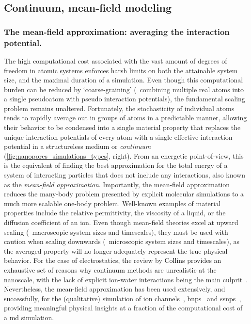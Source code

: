 

\subsection{Continuum, mean-field modeling}
%

\subsubsection{The mean-field approximation: averaging the interaction potential.}
%

The high computational cost associated with the vast amount of degrees of freedom in atomic systems enforces
harsh limits on both the attainable system size, and the maximal duration of a simulation. Even though this
computational burden can be reduced by `coarse-graining' (\ie~combining multiple real atoms into a single
pseudoatom with pseudo interaction potentials), the fundamental scaling problem remains unaltered.
Fortunately, the stochasticity of individual atoms tends to rapidly average out in groups of atoms in a
predictable manner, allowing their behavior to be condensed into a single material property that replaces the
unique interaction potentials of every atom with a single effective interaction potential in a structureless
medium or \emph{continuum} (\cref{fig:nanopores_simulations_types}, right). From an energetic point-of-view,
this is the equivalent of finding the best approximation for the total energy of a system of interacting
particles that does not include any interactions, also known as the \emph{mean-field approximation}.
Importantly, the mean-field approximation reduces the many-body problem presented by explicit molecular
simulations to a much more scalable one-body problem. Well-known examples of material properties include the
relative permittivity, the viscosity of a liquid, or the diffusion coefficient of an ion. Even though
mean-field theories excel at upward scaling (\ie~macroscopic system sizes and timescales), they must be used
with caution when scaling downwards (\ie~microscopic system sizes and timescales), as the averaged property
will no longer adequately represent the true physical behavior. For the case of electrostatics, the review by
Collins provides an exhaustive set of reasons why continuum methods are unrealistic at the nanoscale, with the
lack of explicit ion-water interactions being the main culprit~\cite{Collins-2012}. Nevertheless, the
mean-field approximation has been used extensively, and successfully, for the (qualitative) simulation of ion
channels~\cite{Im-2002,Furini-2006,Liu-2015},
\glspl{bnp}~\cite{Simakov-2010,Pederson-2015,Aguilella-Arzo-2017,Simakov-2018} and
\glspl{ssnp}~\cite{Cervera-2005,White-2008,Chaudhry-2014,Laohakunakorn-2015}, providing meaningful physical
insights at a fraction of the computational cost of a \gls{md} simulation.


